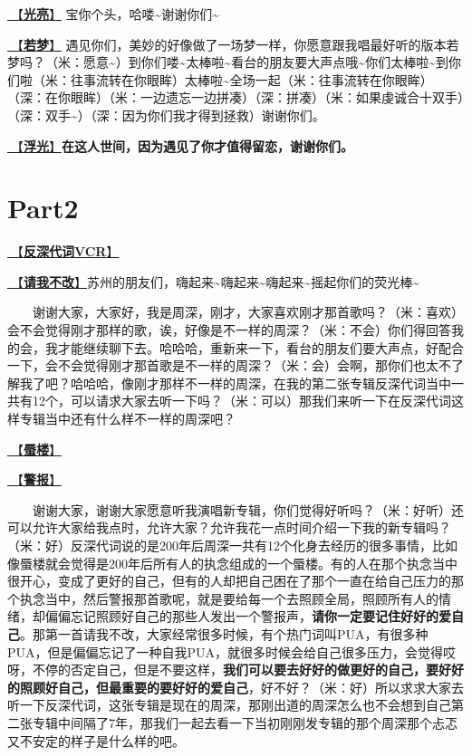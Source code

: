 \documentclass[]{ctexbook}
\begin{document}
\hyperref[silver-linings]{🎵【\textbf{光亮}】} 宝你个头，哈喽\textasciitilde 谢谢你们\textasciitilde{}

\hyperref[ruomeng]{🎵【\textbf{若梦}】} 遇见你们，美妙的好像做了一场梦一样，你愿意跟我唱最好听的版本若梦吗？（米：愿意\textasciitilde）到你们喽\textasciitilde 太棒啦\textasciitilde 看台的朋友要大声点哦\textasciitilde 你们太棒啦\textasciitilde 到你们啦（米：往事流转在你眼眸）太棒啦\textasciitilde 全场一起（米：往事流转在你眼眸）（深：在你眼眸）（米：一边遗忘一边拼凑）（深：拼凑）（米：如果虔诚合十双手）（深：双手\textasciitilde）（深：因为你们我才得到拯救）谢谢你们。

\hyperref[floating-light]{🎵【\textbf{浮光}】}\textbf{在这人世间，因为遇见了你才值得留恋，谢谢你们。}

\section{Part2}\label{suzhou-20241109-part2}

\hyperref[senself-vcr]{🎥【\textbf{反深代词VCR}】}

\hyperref[brave-heart]{🎵【\textbf{请我不改}】}苏州的朋友们，嗨起来\textasciitilde 嗨起来\textasciitilde 嗨起来\textasciitilde 摇起你们的荧光棒\textasciitilde{}

  谢谢大家，大家好，我是周深，刚才，大家喜欢刚才那首歌吗？（米：喜欢）会不会觉得刚才那样的歌，诶，好像是不一样的周深？（米：不会）你们得回答我的会，我才能继续聊下去。哈哈哈，重新来一下，看台的朋友们要大声点，好配合一下，会不会觉得刚才那首歌是不一样的周深？（米：会）会啊，那你们也太不了解我了吧？哈哈哈，像刚才那样不一样的周深，在我的第二张专辑反深代词当中一共有12个，可以请求大家去听一下吗？（米：可以）那我们来听一下在反深代词这样专辑当中还有什么样不一样的周深吧？

\hyperref[mirage]{🎵【\textbf{蜃楼}】}

\hyperref[the-giver]{🎵【\textbf{警报}】}

  谢谢大家，谢谢大家愿意听我演唱新专辑，你们觉得好听吗？（米：好听）还可以允许大家给我点时，允许大家？允许我花一点时间介绍一下我的新专辑吗？（米：好）反深代词说的是200年后周深一共有12个化身去经历的很多事情，比如像蜃楼就会觉得是200年后所有人的执念组成的一个蜃楼。有的人在那个执念当中很开心，变成了更好的自己，但有的人却把自己困在了那个一直在给自己压力的那个执念当中，然后警报那首歌呢，就是要给每一个去照顾全局，照顾所有人的情绪，却偏偏忘记照顾好自己的那些人发出一个警报声，\textbf{请你一定要记住好好的爱自己}。那第一首请我不改，大家经常很多时候，有个热门词叫PUA，有很多种PUA，但是偏偏忘记了一种自我PUA，就很多时候会给自己很多压力，会觉得哎呀，不停的否定自己，但是不要这样，\textbf{我们可以要去好好的做更好的自己，要好好的照顾好自己，但最重要的要好好的爱自己}，好不好？（米：好）所以求求大家去听一下反深代词，这张专辑是现在的周深，那刚出道的周深怎么也不会想到自己第二张专辑中间隔了7年，那我们一起去看一下当初刚刚发专辑的那个周深那个忐忑又不安定的样子是什么样的吧。
\end{document}
